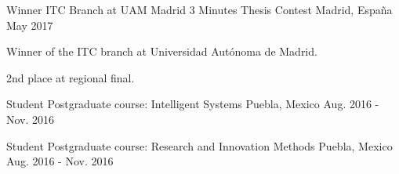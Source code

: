 \begin{cventries}
  \cventry
    {Winner ITC Branch at UAM Madrid} %
    {3 Minutes Thesis Contest} %
    {Madrid, España} %
    {May 2017} %
    {
      \begin{cvitems} %
        \item {Winner of the ITC branch at Universidad Autónoma de Madrid.}
        \item {2nd place at regional final.}
      \end{cvitems}
    }

  \cventry
    {Student} %
    {Postgraduate course: Intelligent Systems} %
    {Puebla, Mexico} %
    {Aug. 2016 - Nov. 2016} %
    {
    }

  \cventry
    {Student} %
    {Postgraduate course: Research and Innovation Methods} %
    {Puebla, Mexico} %
    {Aug. 2016 - Nov. 2016} %
    {
    }
    

\end{cventries}

